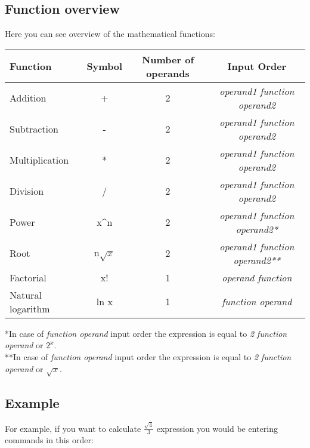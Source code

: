 \documentclass{article}
\begin{document}
\subsection{Function overview}
Here you can see overview of the mathematical functions:
\begin{center}
\begin{tabular}{| l | c | c | c |}
\hline
Function & Symbol & Number of operands & Input Order\\\hline\hline
Addition & + & 2 & \emph{operand1 function operand2}\\\hline
Subtraction & - & 2 & \emph{operand1 function operand2}\\\hline
Multiplication & * & 2 & \emph{operand1 function operand2}\\\hline
Division & / & 2 & \emph{operand1 function operand2}\\\hline
Power & x\^{}n & 2 & \emph{operand1 function operand2*}\\\hline
Root & n$\sqrt{x}$  & 2 & \emph{operand1 function operand2**}\\\hline
Factorial & x! & 1 & \emph{operand function}\\\hline
Natural logarithm & ln x & 1 & \emph{function operand}\\\hline
\end{tabular}
\end{center}
*In case of \emph{function operand} input order the expression is equal to \emph{2 function operand} or  $2^{x}$.\\
**In case of \emph{function operand} input order the expression is equal to \emph{2 function operand} or $\sqrt{x}$.\\

\subsection{Example}
For example, if you want to calculate $\frac{\sqrt{4}}{3}$ expression you would be entering commands in this order:
\end{document}
